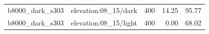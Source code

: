 \begin{longtable}{l>{\raggedright\arraybackslash}p{.42\linewidth}rrr}
b8000\_\allowbreak{}dark\_\allowbreak{}s303 & %
elevation:08\_\allowbreak{}15/dark & %
400 & %
14.25 & %
95.77 \\ %

b8000\_\allowbreak{}dark\_\allowbreak{}s303 & %
elevation:08\_\allowbreak{}15/light & %
400 & %
0.00 & %
68.02 \\ %


\end{longtable}

